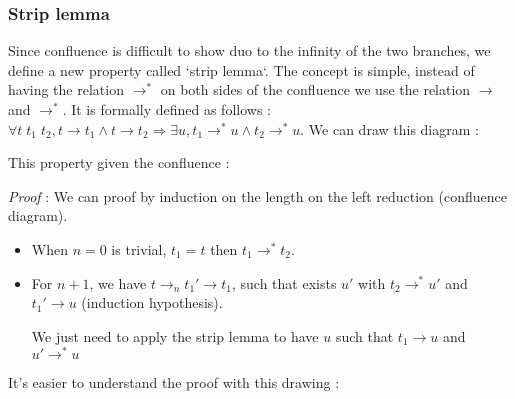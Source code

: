  \subsubsection{Strip lemma}

  Since confluence is difficult to show duo to the infinity of the two branches,
  we define a new property called `strip lemma`. The concept is simple, instead
  of having the relation $\to^*$ on both sides of the confluence we use the
  relation $\to$ and $\to^*$. It is formally defined as follows : $\forall
  t\;t_1\;t_2, t \to t_1 \wedge t \to t_2 \Rightarrow \exists u, t_1 \to^* u
  \wedge t_2 \to^* u$. We can draw this diagram :

  \begin{center}
  \end{center}

  This property given the confluence :

  \textit{Proof} : We can proof by induction on the length on the left reduction
  (confluence diagram).

  \begin{itemize}
    \item When $n = 0$ is trivial, $t_1 = t$ then $t_1 \to^* t_2$.
    \item For $n + 1$, we have $t \to_{n} t_1' \to t_1$, such that exists $u'$
      with $t_2 \to^* u'$ and $t_1' \to u$ (induction hypothesis).

      We just need to apply the strip lemma to have $u$ such that $t_1 \to u$
      and $u' \to^* u$
  \end{itemize}

  It's easier to understand the proof with this drawing :

  \begin{center}
  \end{center}
  \qedsymbol

